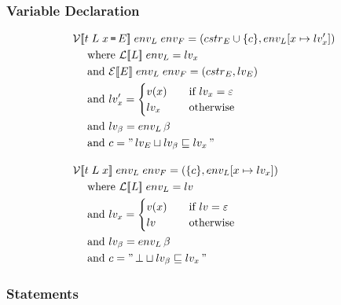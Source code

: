 \subsubsection{Variable Declaration}
\begin{align*}
  & \iV\dblSq{t \; L \; x \tk = E} \; \ienvL \; \ienvF = (\icstr_E \cup \{ c \}, \ienvL[x \mapsto \ilv_x']) \\
  & \dsWhere{\iL\dblSq{L} \; \ienvL = \ilv_x} \\
  & \dsAnd{\iE\dblSq{E} \; \ienvL \; \ienvF = (\icstr_E, \ilv_E)} \\
  & \dsAnd{\ilv_x' = \begin{cases}
  v(x) & \quad \text{if } \ilv_x = \varepsilon \\
  \ilv_x & \quad \text{otherwise}
  \end{cases}} \\
  & \dsAnd{\ilv_\ib = \ienvL \, \ib} \\
  & \dsAnd{c = \literal{\ilv_E \sqcup \ilv_\ib \sqsubseteq \ilv_x}} \rspace
  & \iV\dblSq{t \; L \; x} \; \ienvL \; \ienvF = (\{ c \}, \ienvL[x \mapsto \ilv_x])\\
  & \dsWhere{\iL\dblSq{L} \; \ienvL = \ilv} \\
  & \dsAnd{\ilv_x = \begin{cases}
  v(x) & \quad \text{if } \ilv = \varepsilon \\
  \ilv & \quad \text{otherwise}
  \end{cases}} \\
  & \dsAnd{\ilv_\ib = \ienvL \, \ib} \\
  & \dsAnd{c = \literal{\bot \sqcup \ilv_\ib \sqsubseteq \ilv_x}}
\end{align*}

\subsubsection{Statements}

